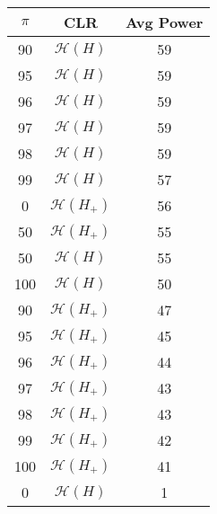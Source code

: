 \centering \begin{tabular}{c|c|c}
$\pi$	&CLR	&Avg Power\\\hline
90	&$\mathcal{H}(H)$	&59\\
95	&$\mathcal{H}(H)$	&59\\
96	&$\mathcal{H}(H)$	&59\\
97	&$\mathcal{H}(H)$	&59\\
98	&$\mathcal{H}(H)$	&59\\
99	&$\mathcal{H}(H)$	&57\\
0	&$\mathcal{H}(H_+)$	&56\\
50	&$\mathcal{H}(H_+)$	&55\\
50	&$\mathcal{H}(H)$	&55\\
100	&$\mathcal{H}(H)$	&50\\
90	&$\mathcal{H}(H_+)$	&47\\
95	&$\mathcal{H}(H_+)$	&45\\
96	&$\mathcal{H}(H_+)$	&44\\
97	&$\mathcal{H}(H_+)$	&43\\
98	&$\mathcal{H}(H_+)$	&43\\
99	&$\mathcal{H}(H_+)$	&42\\
100	&$\mathcal{H}(H_+)$	&41\\
0	&$\mathcal{H}(H)$	&1\\
\end{tabular}
